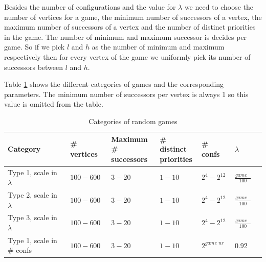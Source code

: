 Besides the number of configurations and the value for $\lambda$ we need to choose the number of vertices for a game, the minimum number of successors of a vertex, the maximum number of successors of a vertex and the number of distinct priorities in the game. The number of minimum and maximum successor is decides per game. So if we pick $l$ and $h$ as the number of minimum and maximum respectively then for every vertex of the game we uniformly pick its number of successors between $l$ and $h$.

Table \ref{tab_random_games} shows the different categories of games and the corresponding parameters. The minimum number of successors per vertex is always 1 so this value is omitted from the table.

\begin{table}[]
\centering
	\begin{tabular}{|l|l|l|l|l|l|l|}
		\hline
		Category & \# vertices & \shortstack{Maximum \\\# successors} & \shortstack{\# distinct\\priorities} & \# confs  & $\lambda$ \\ \hline
		Type 1, scale in $\lambda$ & $100-600$            & $3-20$                   & $1-10$                          & $2^{4}-2^{12}$ & $\frac{\textit{game nr}}{100}$            \\ \hline
		Type 2, scale in $\lambda$ & $100-600$            & $3-20$                   & $1-10$                          & $2^{4}-2^{12}$ & $\frac{\textit{game nr}}{100}$            \\ \hline
		Type 3, scale in $\lambda$ & $100-600$            & $3-20$                   & $1-10$                          & $2^{4}-2^{12}$ & $\frac{\textit{game nr}}{100}$            \\ \hline
		Type 1, scale in \# confs          & $100-600$            &  $3-20$                   & $1-10$                          & $2^\textit{game nr}$                & $0.92$                   \\ \hline
	\end{tabular}
\caption{Categories of random games}
	\label{tab_random_games}
\end{table}
